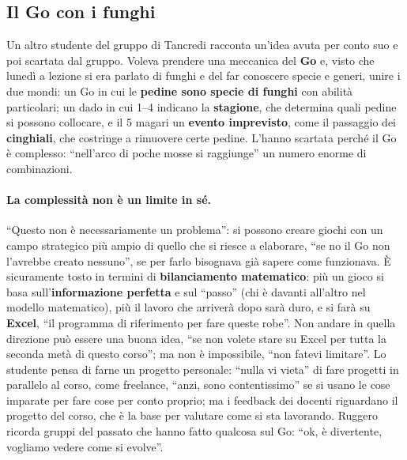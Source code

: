 \subsection{Il Go con i funghi}
\label{a7:sec:tut-go}

Un altro studente del gruppo di Tancredi racconta un'idea avuta per conto suo e poi
scartata dal gruppo. Voleva prendere una meccanica del \textbf{Go} e, visto che lunedì
a lezione si era parlato di funghi e del far conoscere specie e generi, unire i due
mondi: un Go in cui le \textbf{pedine sono specie di funghi} con abilità particolari; un
dado in cui 1--4 indicano la \textbf{stagione}, che determina quali pedine si possono
collocare, e il 5 magari un \textbf{evento imprevisto}, come il passaggio dei
\textbf{cinghiali}, che costringe a rimuovere certe pedine. L'hanno scartata perché il
Go è complesso: ``nell'arco di poche mosse si raggiunge'' un numero enorme di
combinazioni.

\paragraph{La complessità non è un limite in sé.} ``Questo non è necessariamente un
problema'': si possono creare giochi con un campo strategico più ampio di quello che si
riesce a elaborare, ``se no il Go non l'avrebbe creato nessuno'', se per farlo
bisognava già sapere come funzionava. È sicuramente tosto in termini di
\textbf{bilanciamento matematico}: più un gioco si basa sull'\textbf{informazione
perfetta} e sul ``passo'' (chi è davanti all'altro nel modello matematico), più il
lavoro che arriverà dopo sarà duro, e si farà su \textbf{Excel}, ``il programma di
riferimento per fare queste robe''. Non andare in quella direzione può essere una buona
idea, ``se non volete stare su Excel per tutta la seconda metà di questo corso''; ma
non è impossibile, ``non fatevi limitare''. Lo studente pensa di farne un progetto
personale: ``nulla vi vieta'' di fare progetti in parallelo al corso, come freelance,
``anzi, sono contentissimo'' se si usano le cose imparate per fare cose per conto
proprio; ma i feedback dei docenti riguardano il progetto del corso, che è la base per
valutare come si sta lavorando. Ruggero ricorda gruppi del passato che hanno fatto
qualcosa sul Go: ``ok, è divertente, vogliamo vedere come si evolve''.

